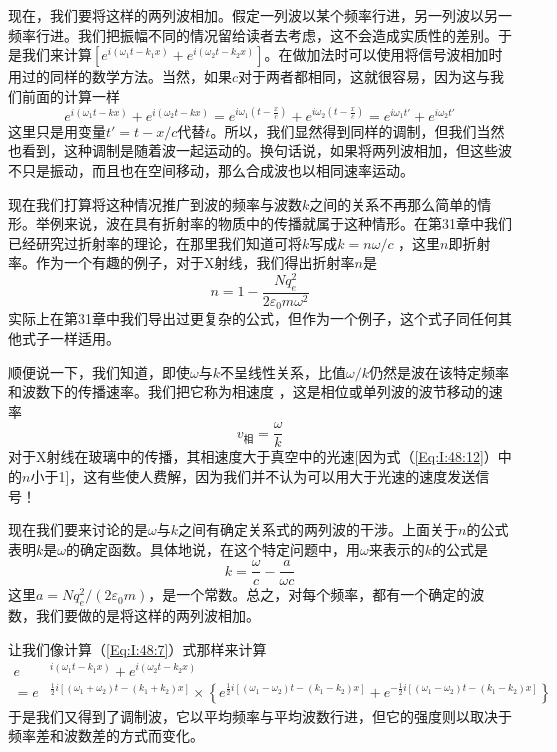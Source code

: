 现在，我们要将这样的两列波相加。假定一列波以某个频率行进，另一列波以另一频率行进。我们把振幅不同的情况留给读者去考虑，这不会造成实质性的差别。于是我们来计算$\left[e^{i(\omega_1t-k_1x)} + e^{i(\omega_2 t -k_2x)}\right]$。在做加法时可以使用将信号波相加时用过的同样的数学方法。当然，如果$c$对于两者都相同，这就很容易，因为这与我们前面的计算一样
\begin{equation}
    \label{Eq:I:48:11}
    e^{i(\omega_1t-kx)} + e^{i(\omega_2 t -kx)} = e^{i\omega_1(t-\frac{x}{c})} + e^{i\omega_2(t-\frac{x}{c})} = e^{i\omega_1t'} + e^{i\omega_2t'}
\end{equation}
这里只是用变量$t'=t -x/c$代替$t$。所以，我们显然得到同样的调制，但我们当然也看到，这种调制是随着波一起运动的。换句话说，如果将两列波相加，但这些波不只是振动，而且也在空间移动，那么合成波也以相同速率运动。

现在我们打算将这种情况推广到波的频率与波数$k$之间的关系不再那么简单的情形。举例来说，波在具有折射率的物质中的传播就属于这种情形。在第31章中我们已经研究过折射率的理论，在那里我们知道可将$k$写成$k=n\omega/c$ ，这里$n$即折射率。作为一个有趣的例子，对于X射线，我们得出折射率$n$是
\begin{equation}
    \label{Eq:I:48:12}
    n = 1 - \frac{Nq_e^2}{2\varepsilon_0m\omega^2}
\end{equation}
实际上在第31章中我们导出过更复杂的公式，但作为一个例子，这个式子同任何其他式子一样适用。

顺便说一下，我们知道，即使$\omega$与$k$不呈线性关系，比值$\omega /k$仍然是波在该特定频率和波数下的传播速率。我们把它称为相速度 ，这是相位或单列波的波节移动的速率
\begin{equation}
    \label{Eq:I:48:13}
    v_\text{相} = \frac{\omega}{k}
\end{equation}
对于X射线在玻璃中的传播，其相速度大于真空中的光速[因为式（\ref{Eq:I:48:12}）中的$n$小于1]，这有些使人费解，因为我们并不认为可以用大于光速的速度发送信号！

现在我们要来讨论的是$\omega$与$k$之间有确定关系式的两列波的干涉。上面关于$n$的公式表明$k$是$\omega$的确定函数。具体地说，在这个特定问题中，用$\omega$来表示的$k$的公式是
\begin{equation}
    \label{Eq:I:48:14}
    k = \frac{\omega}{c} - \frac{a}{\omega c}
\end{equation}
这里$a=Nq_e^2/(2\varepsilon_0m)$，是一个常数。总之，对每个频率，都有一个确定的波数，我们要做的是将这样的两列波相加。

让我们像计算（\ref{Eq:I:48:7}）式那样来计算
\begin{equation}
    \label{Eq:I:48:15}
    \begin{aligned}
        e&^{i(\omega_1t - k_1x)} + e^{i(\omega_2t - k_2x)} \\
        = e&^{\frac{1}{2}i[(\omega_1+\omega_2)t-(k_1+k_2)x]} \times \left\{e^{\frac{1}{2}i[(\omega_1-\omega_2)t-(k_1-k_2)x]} + e^{-\frac{1}{2}i[(\omega_1 - \omega_2)t - (k_1-k_2)x]}\right\}
    \end{aligned}
\end{equation}
于是我们又得到了调制波，它以平均频率与平均波数行进，但它的强度则以取决于频率差和波数差的方式而变化。


